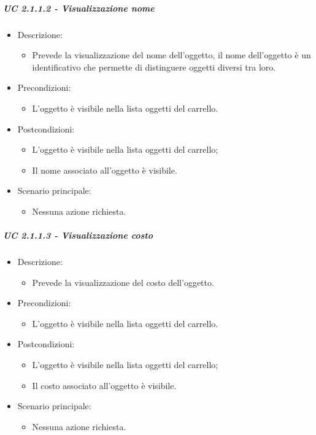 \subparagraph{UC 2.1.1.2 - Visualizzazione nome}
\begin{itemize}
	
	\item Descrizione:
	\begin{itemize}
		\item Prevede la visualizzazione del nome dell'oggetto, il nome dell'oggetto è un identificativo che permette di distinguere oggetti diversi tra loro.
	\end{itemize}
	
	\item Precondizioni:
	\begin{itemize}
		\item L'oggetto è visibile nella lista oggetti del carrello.
	\end{itemize}
	
	\item Postcondizioni:
	\begin{itemize}
		\item L'oggetto è visibile nella lista oggetti del carrello;
		\item Il nome associato all'oggetto è visibile.
	\end{itemize}
	
	\item Scenario principale:
	\begin{itemize}
		\item Nessuna azione richiesta.
	\end{itemize}
	
\end{itemize}

\subparagraph{UC 2.1.1.3 - Visualizzazione costo}
\begin{itemize}
	
	\item Descrizione:
	\begin{itemize}
		\item Prevede la visualizzazione del costo dell'oggetto.
	\end{itemize}
	
	\item Precondizioni:
	\begin{itemize}
		\item L'oggetto è visibile nella lista oggetti del carrello.
	\end{itemize}
	
	\item Postcondizioni:
	\begin{itemize}
		\item L'oggetto è visibile nella lista oggetti del carrello;
		\item Il costo associato all'oggetto è visibile.
	\end{itemize}
	
	\item Scenario principale:
	\begin{itemize}
		\item Nessuna azione richiesta.
	\end{itemize}
	
\end{itemize}

